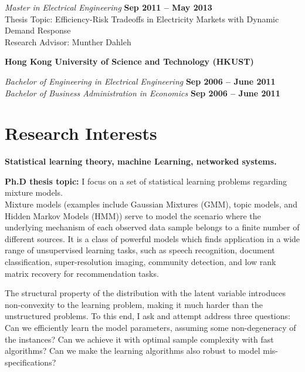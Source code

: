 \documentclass[margin,line,11pt]{resume}
\begin{document}
\begin{resume}
  \vspace{-12pt}
  \textsl{Master in Electrical Engineering} \hfill \textbf{ Sep 2011 -- May
    2013}
  \\
  {Thesis Topic}: Efficiency-Risk Tradeoffs in Electricity Markets with Dynamic Demand
  Response
  \\
  {Research Advisor}: Munther Dahleh

  \vspace{-10pt}
  \textbf{Hong Kong University of Science and Technology (HKUST)}

  \vspace{-12pt}
  \textsl{Bachelor of Engineering in Electrical Engineering} \hfill \textbf{ Sep 2006 --
    June 2011}
  \\
  \textsl{Bachelor of Business Administration in Economics} \hfill \textbf{ Sep 2006 --
    June 2011}

  \section{\mysidestyle Research Interests}
  \textbf{Statistical learning theory, machine Learning, networked systems.}

  \vspace{-6pt}

  \textbf{Ph.D thesis topic:} I focus on a set of statistical learning problems regarding
  mixture models.
  \\
  Mixture models (examples include Gaussian Mixtures (GMM), topic models, and Hidden
  Markov Models (HMM)) serve to model the scenario where the underlying mechanism of each
  observed data sample belongs to a finite number of different sources.
  It is a class of powerful models which finds application in a wide range of unsupervised
  learning tasks, such as speech recognition, document classification, super-resolution
  imaging, community detection, and low rank matrix recovery for recommendation tasks.

  \vspace{-8pt}

  The structural property of the distribution with the latent variable introduces
  non-convexity to the learning problem, making it much harder than the unstructured
  problems.
  To this end, I ask and attempt address three questions: Can we efficiently learn the
  model parameters, assuming some non-degeneracy of the instances?  Can we achieve it with
  optimal sample complexity with fast algorithms? Can we make the learning algorithms also
  robust to model mis-specifications?


\end{resume}
\end{document}
